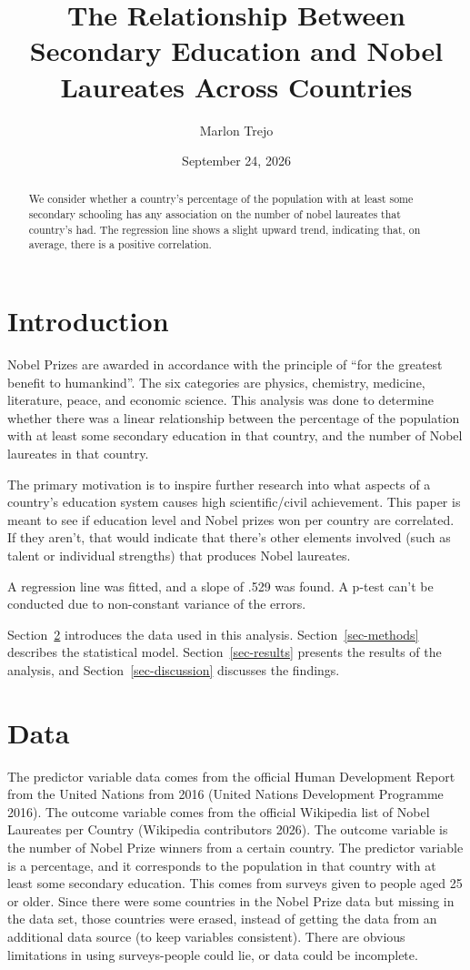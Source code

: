 \documentclass[
  letterpaper,
  DIV=11,
  numbers=noendperiod]{scrartcl}
\title{The Relationship Between Secondary Education and Nobel Laureates
Across Countries}
\author{Marlon Trejo}
\date{September 24, 2026}
\begin{document}
\maketitle
\begin{abstract}
We consider whether a country's percentage of the population with at
least some secondary schooling has any association on the number of
nobel laureates that country's had. The regression line shows a slight
upward trend, indicating that, on average, there is a positive
correlation.
\end{abstract}


\section{Introduction}\label{introduction}

Nobel Prizes are awarded in accordance with the principle of ``for the
greatest benefit to humankind''. The six categories are physics,
chemistry, medicine, literature, peace, and economic science. This
analysis was done to determine whether there was a linear relationship
between the percentage of the population with at least some secondary
education in that country, and the number of Nobel laureates in that
country.

The primary motivation is to inspire further research into what aspects
of a country's education system causes high scientific/civil
achievement. This paper is meant to see if education level and Nobel
prizes won per country are correlated. If they aren't, that would
indicate that there's other elements involved (such as talent or
individual strengths) that produces Nobel laureates.

A regression line was fitted, and a slope of .529 was found. A p-test
can't be conducted due to non-constant variance of the errors.

Section~\ref{sec-data} introduces the data used in this analysis.
Section~\ref{sec-methods} describes the statistical model.
Section~\ref{sec-results} presents the results of the analysis, and
Section~\ref{sec-discussion} discusses the findings.

\section{Data}\label{sec-data}

The predictor variable data comes from the official Human Development
Report from the United Nations from 2016 (United Nations Development
Programme 2016). The outcome variable comes from the official Wikipedia
list of Nobel Laureates per Country (Wikipedia contributors 2026). The
outcome variable is the number of Nobel Prize winners from a certain
country. The predictor variable is a percentage, and it corresponds to
the population in that country with at least some secondary education.
This comes from surveys given to people aged 25 or older. Since there
were some countries in the Nobel Prize data but missing in the data set,
those countries were erased, instead of getting the data from an
additional data source (to keep variables consistent). There are obvious
limitations in using surveys-people could lie, or data could be
incomplete.
\end{document}
